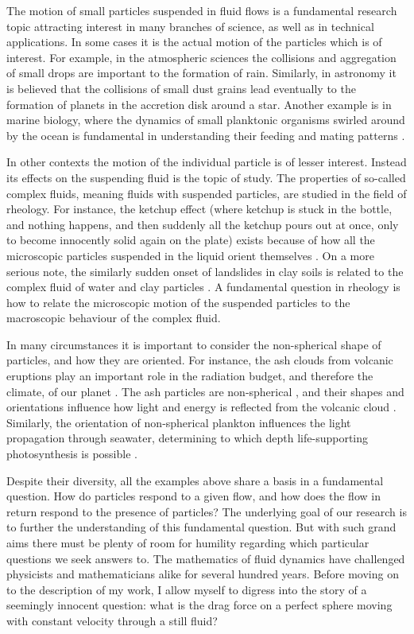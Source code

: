 \documentclass[thesis.tex]{subfiles}
\begin{document}
The motion of small particles suspended in fluid flows is a fundamental research topic attracting interest in many branches of science, as well as in technical applications. In some cases it is the actual motion of the particles which is of interest. For example, in the atmospheric sciences the collisions and aggregation of small drops are important to the formation of rain. Similarly, in astronomy it is believed that the collisions of small dust grains lead eventually to the formation of planets in the accretion disk around a star. Another example is in marine biology, where the dynamics of small planktonic organisms swirled around by the ocean is fundamental in understanding their feeding and mating patterns \cite{guasto2012}. 

In other contexts the motion of the individual particle is of lesser interest. Instead its effects on the suspending fluid is the topic of study. The properties of so-called complex fluids, meaning fluids with suspended particles, are studied in the field of rheology. For instance, the ketchup effect (where ketchup is stuck in the bottle, and nothing happens, and then suddenly all the ketchup pours out at once, only to become innocently solid again on the plate) exists because of how all the microscopic particles suspended in the liquid orient themselves \cite{bayod2008}. On a more serious note, the similarly sudden onset of landslides in clay soils is related to the complex fluid of water and clay particles \cite{coussot2002}. A fundamental question in rheology is how to relate the microscopic motion of the suspended particles to the macroscopic behaviour of the complex fluid.

In many circumstances it is important to consider the non-spherical shape of particles, and how they are oriented. For instance, the ash clouds from volcanic eruptions play an important role in the radiation budget, and therefore the climate, of our planet \cite{mather2003}. The ash particles are non-spherical \cite{gasteiger2011}, and their shapes and orientations influence how light and energy is reflected from the volcanic cloud \cite{dubovik2002}. Similarly, the orientation of non-spherical plankton influences the light propagation through seawater, determining to which depth life-supporting photosynthesis is possible \cite{marcos2011}. 

Despite their diversity, all the examples above share a basis in a fundamental question. How do particles respond to a given flow, and how does the flow in return respond to the presence of particles? The underlying goal of our research is to further the understanding of this fundamental question. But with such grand aims there must be plenty of room for humility regarding which particular questions we seek answers to. The mathematics of fluid dynamics have challenged physicists and mathematicians alike for several hundred years. Before moving on to the description of my work, I allow myself to digress into the story of a seemingly innocent question: what is the drag force on a perfect sphere moving with constant velocity through a still fluid?
\end{document}
